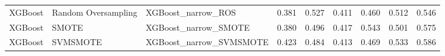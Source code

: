 \begin{tabular}{lllllllll}
                     XGBoost & Random Oversampling &                           XGBoost\_narrow\_ROS & 0.381 &                     0.527 &                 0.411 &                  0.460 &                                   0.512 &     0.546 \\
                     XGBoost &               SMOTE &                         XGBoost\_narrow\_SMOTE & 0.380 &                     0.496 &                 0.417 &                  0.543 &                                   0.501 &     0.575 \\
                     XGBoost &            SVMSMOTE &                      XGBoost\_narrow\_SVMSMOTE & 0.423 &                     0.484 &                 0.413 &                  0.469 &                                   0.533 &     0.586 \\
\bottomrule
\end{tabular}
